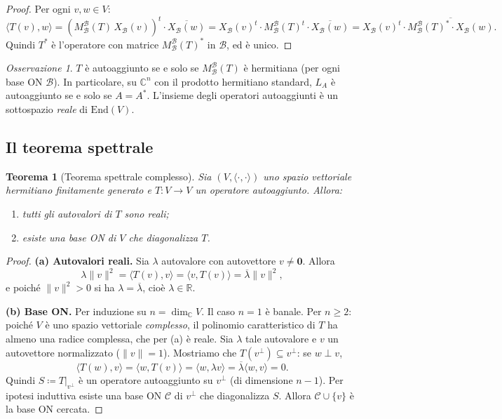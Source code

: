 \documentclass[11pt, a4paper]{book}
\theoremstyle{definition}
\theoremstyle{plain}
\newtheorem{teorema}[definizione]{Teorema}
\theoremstyle{remark}
\newtheorem{osservazione}[definizione]{Osservazione}
\newcommand{\R}{\mathbb{R}}
\newcommand{\C}{\mathbb{C}}
\begin{document}
\begin{proof}
Per ogni $v,w \in V$:
\[
  \langle T(v),w\rangle = (M^\mathcal{B}_\mathcal{B}(T)\,X_\mathcal{B}(v))^t \cdot \overline{X_\mathcal{B}(w)} = X_\mathcal{B}(v)^t \cdot M^\mathcal{B}_\mathcal{B}(T)^t \cdot \overline{X_\mathcal{B}(w)} = X_\mathcal{B}(v)^t \cdot \overline{M^\mathcal{B}_\mathcal{B}(T)^* \cdot X_\mathcal{B}(w)}.
\]
Quindi $T^*$ è l'operatore con matrice $M^\mathcal{B}_\mathcal{B}(T)^*$ in $\mathcal{B}$, ed è unico.
\end{proof}

\begin{osservazione}
$T$ è autoaggiunto se e solo se $M^\mathcal{B}_\mathcal{B}(T)$ è hermitiana (per ogni base ON $\mathcal{B}$). In particolare, su $\C^n$ con il prodotto hermitiano standard, $L_A$ è autoaggiunto se e solo se $A = A^*$. L'insieme degli operatori autoaggiunti è un sottospazio \emph{reale} di $\mathrm{End}(V)$.
\end{osservazione}

\subsection{Il teorema spettrale}

\begin{teorema}[Teorema spettrale complesso]
\label{thm:spettrale-complesso}
Sia $(V,\langle\cdot,\cdot\rangle)$ uno spazio vettoriale hermitiano finitamente generato e $T \colon V \to V$ un operatore autoaggiunto. Allora:
\begin{enumerate}[label=(\alph*)]
  \item tutti gli autovalori di $T$ sono reali;
  \item esiste una base ON di $V$ che diagonalizza $T$.
\end{enumerate}
\end{teorema}

\begin{proof}
\textbf{(a) Autovalori reali.} Sia $\lambda$ autovalore con autovettore $v \neq \mathbf{0}$. Allora
\[
  \lambda\|v\|^2 = \langle T(v),v\rangle = \langle v,T(v)\rangle = \overline{\lambda}\|v\|^2,
\]
e poiché $\|v\|^2 > 0$ si ha $\lambda = \overline{\lambda}$, cioè $\lambda \in \R$.

\textbf{(b) Base ON.} Per induzione su $n = \dim_\C V$. Il caso $n = 1$ è banale. Per $n \geq 2$: poiché $V$ è uno spazio vettoriale \emph{complesso}, il polinomio caratteristico di $T$ ha almeno una radice complessa, che per (a) è reale. Sia $\lambda$ tale autovalore e $v$ un autovettore normalizzato ($\|v\|=1$). Mostriamo che $T(v^\perp) \subseteq v^\perp$: se $w \perp v$,
\[
  \langle T(w),v\rangle = \langle w,T(v)\rangle = \langle w,\lambda v\rangle = \overline{\lambda}\langle w,v\rangle = 0.
\]
Quindi $S \coloneqq T|_{v^\perp}$ è un operatore autoaggiunto su $v^\perp$ (di dimensione $n-1$). Per ipotesi induttiva esiste una base ON $\mathcal{C}$ di $v^\perp$ che diagonalizza $S$. Allora $\mathcal{C} \cup \{v\}$ è la base ON cercata.
\end{proof}
\end{document}
